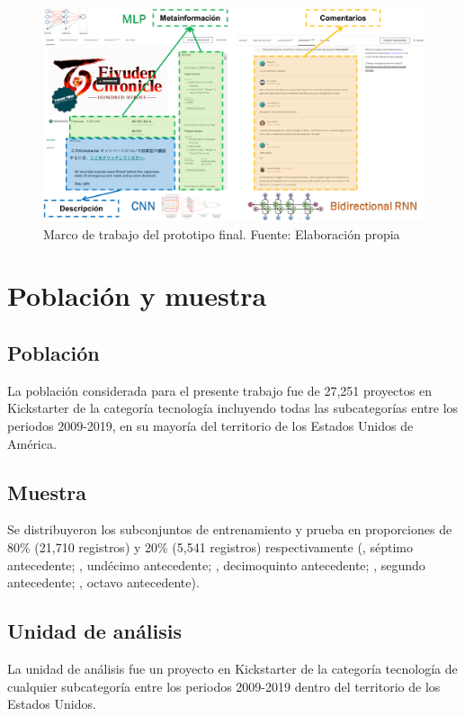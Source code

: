 \begin{figure}[htbp]
	\begin{center}
		\includegraphics[width=1\textwidth]{3/figures/framework.png}
		\caption{Marco de trabajo del prototipo final. Fuente: Elaboración propia}
		\label{3:fig1}
	\end{center}
\end{figure}

\section{Población y muestra}

\subsection{Población}
La población considerada para el presente trabajo fue de 27,251 proyectos en Kickstarter de la categoría tecnología incluyendo todas las subcategorías entre los periodos 2009-2019, en su mayoría del territorio de los Estados Unidos de América.

\subsection{Muestra}
Se distribuyeron los subconjuntos de entrenamiento y prueba en proporciones de 80\% (21,710 registros) y 20\% (5,541 registros) respectivamente (\citeauthor{pr_yuan2016textanalytics}, séptimo antecedente; \citeauthor{pr_yu2018deeplearning}, undécimo antecedente; \citeauthor{pr_chen2019keywords_crowdfunding}, decimoquinto antecedente; \citeauthor{pr_mitra2014phrases}, segundo antecedente; \citeauthor{pr_sawhney2016usingLT}, octavo antecedente).

\subsection{Unidad de análisis}
La unidad de análisis fue un proyecto en Kickstarter de la categoría tecnología de cualquier subcategoría entre los periodos 2009-2019 dentro del territorio de los Estados Unidos.

